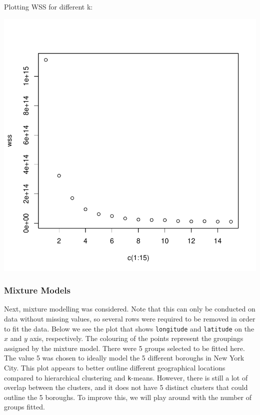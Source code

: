 \documentclass[11pt, a4paper]{article}
\begin{document}
\begin{Schunk}
\begin{Soutput}
Plotting WSS for different k:
\end{Soutput}
\end{Schunk}
\includegraphics{project_report-017}


\pagebreak
\subsubsection{Mixture Models}

Next, mixture modelling was considered. Note that this can only be conducted on data without missing values, so several rows were required to be removed in order to fit the data. Below we see the plot that shows \texttt{longitude} and \texttt{latitude} on the $x$ and $y$ axis, respectively. The colouring of the points represent the groupings assigned by the mixture model. There were 5 groups selected to be fitted here. The value 5 was chosen to ideally model the 5 different boroughs in New York City. This plot appears to better outline different geographical locations compared to hierarchical clustering and \texttt{k}-means. However, there is still a lot of overlap between the clusters, and it does not have 5 distinct clusters that could outline the 5 boroughs. To improve this, we will play around with the number of groups fitted.
\end{document}
